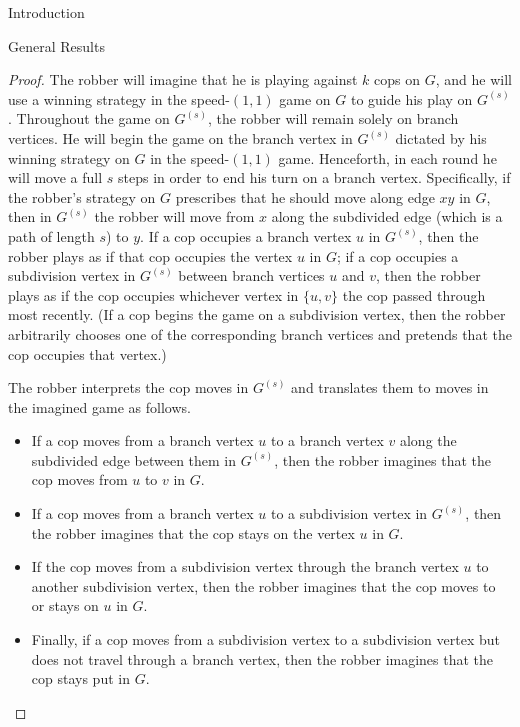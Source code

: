 \documentclass[12pt]{amsart}
\theoremstyle{definition}
\begin{document}
\begin{section}{Introduction}
\begin{section}{General Results}
\begin{proof}
    The robber will imagine that he is playing against $k$ cops on $G$, and he will use a winning strategy in the speed-$(1,1)$ game on $G$ to guide his play on $G^{(s)}$.  Throughout the game on $G^{(s)}$, the robber will remain solely on branch vertices.  He will begin the game on the branch vertex in $G^{(s)}$ dictated by his winning strategy on $G$ in the speed-$(1,1)$ game.  Henceforth, in each round he will move a full $s$ steps in order to end his turn on a branch vertex.  Specifically, if the robber's strategy on $G$ prescribes that he should move along edge $xy$ in $G$, then in $G^{(s)}$ the robber will move from $x$ along the subdivided edge (which is a path of length $s$) to $y$.  If a cop occupies a branch vertex $u$ in $G^{(s)}$, then the robber plays as if that cop occupies the vertex $u$ in $G$; if a cop occupies a subdivision vertex in $G^{(s)}$ between branch vertices $u$ and $v$, then the robber plays as if the cop occupies whichever vertex in $\{u,v\}$ the cop passed through most recently.  (If a cop begins the game on a subdivision vertex, then the robber arbitrarily chooses one of the corresponding branch vertices and pretends that the cop occupies that vertex.)
    
    The robber interprets the cop moves in $G^{(s)}$ and translates them to moves in the imagined game as follows.
    \begin{itemize}
        \item 
            If a cop moves from a branch vertex $u$ to a branch vertex $v$ along the subdivided edge between them in $G^{(s)}$, then the robber imagines that the cop moves from $u$ to $v$ in $G$.  %
        \item
            If a cop moves from a branch vertex $u$ to a subdivision vertex in $G^{(s)}$, then the robber imagines that the cop stays on the vertex $u$ in $G$.
        \item
            If the cop moves from a subdivision vertex through the branch vertex $u$ to another subdivision vertex, then the robber imagines that the cop moves to or stays on $u$ in $G$.
        \item
            Finally, if a cop moves from a subdivision vertex to a subdivision vertex but does not travel through a branch vertex, then the robber imagines that the cop stays put in $G$.
    \end{itemize}
    

\end{proof}
\end{section}
\end{section}
\end{document}
